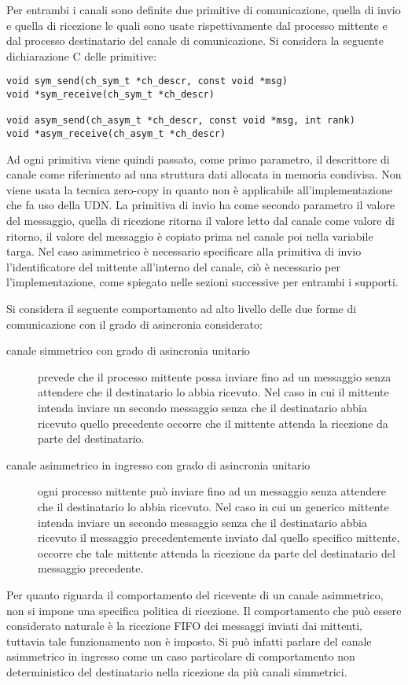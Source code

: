 Per entrambi i canali sono definite due primitive di comunicazione, quella di invio e quella di ricezione le quali sono usate rispettivamente dal processo mittente e dal processo destinatario del canale di comunicazione. Si considera la seguente dichiarazione C delle primitive:
\begin{lstlisting}[morekeywords={ch_sym_t, ch_asym_t}]
void sym_send(ch_sym_t *ch_descr, const void *msg)
void *sym_receive(ch_sym_t *ch_descr)

void asym_send(ch_asym_t *ch_descr, const void *msg, int rank)
void *asym_receive(ch_asym_t *ch_descr)
\end{lstlisting}
Ad ogni primitiva viene quindi passato, come primo parametro, il descrittore di canale come riferimento ad una struttura dati allocata in memoria condivisa. Non viene usata la tecnica zero-copy in quanto non \`e applicabile all'implementazione che fa uso della UDN. La primitiva di invio ha come secondo parametro il valore del messaggio, quella di ricezione ritorna il valore letto dal canale come valore di ritorno, il valore del messaggio \`e copiato prima nel canale poi nella variabile targa. Nel caso asimmetrico \`e necessario specificare alla primitiva di invio l'identificatore del mittente all'interno del canale, ci\`o \`e necessario per l'implementazione, come spiegato nelle sezioni successive per entrambi i supporti.

Si considera il seguente comportamento ad alto livello delle due forme di comunicazione con il grado di asincronia considerato:
\begin{description}
\item [canale simmetrico con grado di asincronia unitario] prevede che il processo mittente possa inviare fino ad un messaggio senza attendere che il destinatario lo abbia ricevuto. Nel caso in cui il mittente intenda inviare un secondo messaggio senza che il destinatario abbia ricevuto quello precedente occorre che il mittente attenda la ricezione da parte del destinatario.
\item [canale asimmetrico in ingresso con grado di asincronia unitario] \hfill ogni processo mittente pu\`o inviare fino ad un messaggio senza attendere che il destinatario lo abbia ricevuto. Nel caso in cui un generico mittente intenda inviare un secondo messaggio senza che il destinatario abbia ricevuto il messaggio precedentemente inviato dal quello specifico mittente, occorre che tale mittente attenda la ricezione da parte del destinatario del messaggio precedente. 
\end{description}
Per quanto riguarda il comportamento del ricevente di un canale asimmetrico, non si impone una specifica politica di ricezione. Il comportamento che pu\`o essere considerato naturale \`e la ricezione FIFO dei messaggi inviati dai mittenti, tuttavia tale funzionamento non \`e imposto. Si pu\`o infatti parlare del canale asimmetrico in ingresso come un caso particolare di comportamento non deterministico del destinatario nella ricezione da pi\`u canali simmetrici.

